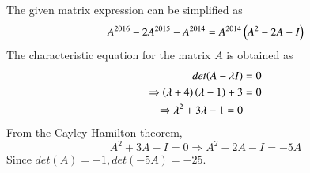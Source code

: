 %
The given matrix expression can be simplified as
%
\begin{align}
A^{2016}-2A^{2015}-A^{2014} = A^{2014}\left(A^2-2A-I\right) 
\end{align}
%
The characteristic equation for the matrix $A$ is obtained as
%
\begin{align}
det(A-\lambda I) &= 0
\\
\Rightarrow \left(\lambda +4\right)\left(\lambda -1\right) +3 &= 0
\\
\Rightarrow \lambda^2 +3 \lambda -1 = 0
\end{align}
%
From the Cayley-Hamilton theorem,
%
\begin{equation}
A^2+3A-I = 0 \Rightarrow A^2-2A-I = -5A
\end{equation}
%
Since $det(A) = -1, det(-5A) = -25$.
